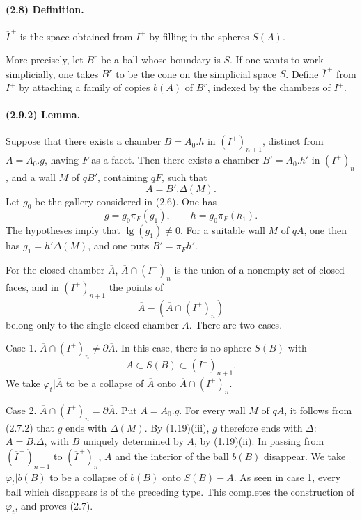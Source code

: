 \documentclass[10pt]{article}
\begin{document}
\paragraph{(2.8) Definition.} \(\overline I^{\, +}\) is the space obtained from \(I^+\) by filling in the spheres \(S(A)\).

More precisely, let \(B^r\) be a ball whose boundary is \(S\). If one wants to work simplicially, one takes \(B^r\) to be the cone on the simplicial space \(S\). Define \(\overline I^{\, +}\) from \(I^+\) by attaching a family of copies \(b(A)\) of \(B^r\), indexed by the chambers of \(I^+\).

\paragraph{(2.9.2) Lemma.} Suppose that there exists a chamber \(B=A_0.h\) in \((I^+)_{n+1}\), distinct from \(A=A_0.g\), having \(F\) as a facet. Then there exists a chamber \(B'=A_0.h'\) in \((I^+)_n\), and a wall \(M\) of \(qB'\), containing \(qF\), such that
\[
A=B'.\Delta(M).
\]
Let \(g_0\) be the gallery considered in (2.6). One has
\[
g=g_0\pi_F(g_1),\qquad h=g_0\pi_F(h_1).
\]
The hypotheses imply that \(\operatorname{lg}(g_1)\ne0\). For a suitable wall \(M\) of \(qA\), one then has \(g_1=h'\Delta(M)\), and one puts \(B'=\pi_Fh'\).

For the closed chamber \(\overline A\), \(\overline A\cap(I^+)_n\) is the union of a nonempty set of closed faces, and in \((I^+)_{n+1}\) the points of
\[
\overline A-(\overline A\cap(I^+)_n)
\]
belong only to the single closed chamber \(\overline A\). There are two cases.

Case 1. \(\overline A\cap(I^+)_n\ne\partial\overline A\). In this case, there is no sphere \(S(B)\) with
\[
A\subset S(B)\subset (I^+)_{n+1}.
\]
We take \(\varphi_t|\overline A\) to be a collapse of \(\overline A\) onto \(\overline A\cap(I^+)_n\).

Case 2. \(\overline A\cap(I^+)_n=\partial\overline A\). Put \(A=A_0.g\). For every wall \(M\) of \(qA\), it follows from (2.7.2) that \(g\) ends with \(\Delta(M)\). By (1.19)(iii), \(g\) therefore ends with \(\Delta\): \(A=B.\Delta\), with \(B\) uniquely determined by \(A\), by (1.19)(ii). In passing from \((\overline I^{\, +})_{n+1}\) to \((\overline I^{\, +})_n\), \(A\) and the interior of the ball \(b(B)\) disappear. We take \(\varphi_t|b(B)\) to be a collapse of \(b(B)\) onto \(S(B)-A\). As seen in case 1, every ball which disappears is of the preceding type. This completes the construction of \(\varphi_t\), and proves (2.7).
\end{document}
